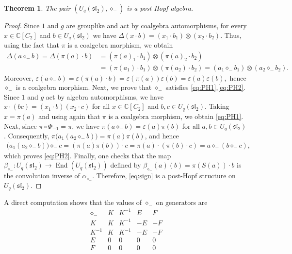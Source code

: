 \documentclass[11pt,english]{article}
\newcommand{\eps}{\varepsilon}
\newcommand{\Del}{\Delta}
\newcommand{\act}{\mathbin{\diamond}}
\newtheorem{theorem}[lemma]{Theorem}
\theoremstyle{definition}
\begin{document}
\begin{theorem}
The pair $(U_q(\mathfrak{sl}_2), \act_-)$ is a post-Hopf algebra.
\end{theorem}
\begin{proof}
Since $1$ and $g$ are grouplike and act by
coalgebra automorphisms, for every
$x\in\mathbb{C}[C_2]$ and $b\in U_q(\mathfrak{sl}_2)$
we have $\Del(x\cdot b)
=(x_1\cdot b_1)\otimes(x_2\cdot b_2)$.
Thus, using the fact that $\pi$ is a coalgebra
morphism, we obtain
\[
\begin{aligned}
\Del(a\act_- b)
=\Del(\pi(a)\cdot b)&=(\pi(a)_1\cdot b_1)\otimes
  (\pi(a)_2\cdot b_2)\\
  &=(\pi(a_1)\cdot b_1)\otimes
  (\pi(a_2)\cdot b_2)=(a_1\act_- b_1)\otimes(a_2\act_- b_2).
\end{aligned}
\]
Moreover, $\eps(a\act_- b)
=\eps(\pi(a)\cdot b)
=\eps(\pi(a))\eps(b)
=\eps(a)\eps(b),$
hence $\act_-$ is a coalgebra morphism.
Next, we prove that $\act_-$ satisfies \eqref{eq:PH1},\eqref{eq:PH2}. 
Since $1$ and $g$ act by algebra
automorphisms, we have $x\cdot(bc)=(x_1\cdot b)(x_2\cdot c)$
for all $x\in\mathbb{C}[C_2]$ and
$b,c\in U_q(\mathfrak{sl}_2)$.
Taking $x=\pi(a)$ and using again that $\pi$
is a coalgebra morphism, we obtain \eqref{eq:PH1}.
Next, since $\pi\circ\Phi_{-1}=\pi$, we have
$\pi(a\act_-b)=\eps(a)\pi(b)$ for all
$a,b\in U_q(\mathfrak{sl}_2)$.
Consequently,
$\pi\bigl(a_1(a_2\act_-b)\bigr)=\pi(a)\pi(b)$,
and hence
\[
\begin{aligned}
\bigl(a_1(a_2\act_-b)\bigr)\act_-c
=(\pi(a)\pi(b))\cdot c=\pi(a)\cdot(\pi(b)\cdot c)=a\act_-(b\act_-c),
\end{aligned}
\]
which proves \eqref{eq:PH2}. Finally, one checks that the map
$\beta_{\act_-}:U_q(\mathfrak{sl}_2)
\to\operatorname{End}(U_q(\mathfrak{sl}_2))$
defined by $\beta_{\act_-}(a)(b)=\pi(S(a))\cdot b$
is the convolution inverse of $\alpha_{\act_-}$.
Therefore, \eqref{eq:sign} is a post-Hopf structure
on $U_q(\mathfrak{sl}_2)$. 
\end{proof}
A direct computation shows that the values of $\act_-$ on generators are
\begin{equation}\label{eq:sign-gen}
\begin{array}{c|cccc}
\act_- & K & K^{-1} & E & F\\ \hline
K      & K & K^{-1} & -E & -F\\
K^{-1} & K & K^{-1} & -E & -F\\
E      & 0 & 0 & 0 & 0\\
F      & 0 & 0 & 0 & 0
\end{array}
\end{equation} 
\end{document}
